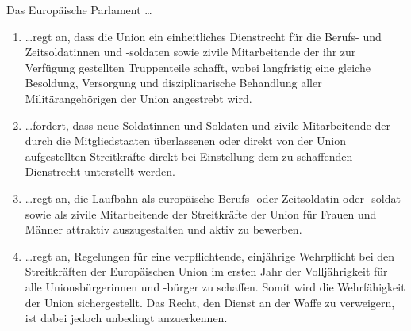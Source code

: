 \documentclass[12pt,a4paper]{article}
\begin{document}
\noindent Das Europäische Parlament \ldots

\begin{enumerate}[leftmargin=2em, start=8, itemsep=10pt]
    \item \ldots regt an, dass die Union ein einheitliches Dienstrecht für die Berufs- und Zeitsoldatinnen und -soldaten sowie zivile Mitarbeitende der ihr zur Verfügung gestellten Truppenteile schafft, wobei langfristig eine gleiche Besoldung, Versorgung und disziplinarische Behandlung aller Militärangehörigen der Union angestrebt wird.

    \item \ldots fordert, dass neue Soldatinnen und Soldaten und zivile Mitarbeitende der durch die Mitgliedstaaten überlassenen oder direkt von der Union aufgestellten Streitkräfte direkt bei Einstellung dem zu schaffenden Dienstrecht unterstellt werden.

    \item \ldots regt an, die Laufbahn als europäische Berufs- oder Zeitsoldatin oder -soldat sowie als zivile Mitarbeitende der Streitkräfte der Union für Frauen und Männer attraktiv auszugestalten und aktiv zu bewerben.

    \item \ldots regt an, Regelungen für eine verpflichtende, einjährige Wehrpflicht bei den Streitkräften der Europäischen Union im ersten Jahr der Volljährigkeit für alle Unionsbürgerinnen und -bürger zu schaffen. Somit wird die Wehrfähigkeit der Union sichergestellt. Das Recht, den Dienst an der Waffe zu verweigern, ist dabei jedoch unbedingt anzuerkennen.
\end{enumerate}
\end{document}
